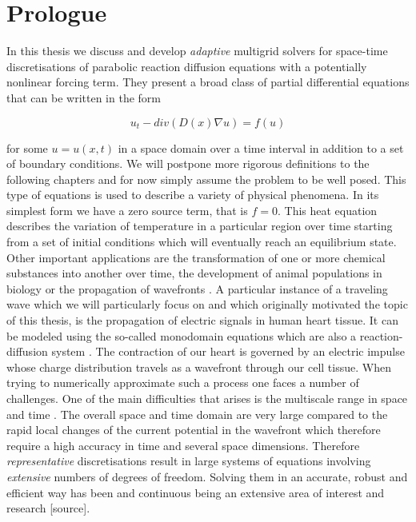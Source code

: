\documentclass[../draft_1.tex]{subfiles}
\begin{document}
\chapter{Prologue}

In this thesis we  discuss and develop \textit{adaptive} multigrid solvers for space-time discretisations of parabolic reaction diffusion equations with a potentially nonlinear forcing term. They present a broad class of partial differential equations that can be written in the form
\begin{ceqn}
\begin{equation}
u_t - div ( D(x) \nabla u) = f(u)
\end{equation}
\end{ceqn}
for some $u = u(x,t)$ in a space domain over a time interval in addition to a set of boundary conditions. We will postpone more rigorous definitions to the following chapters and for now simply assume the problem to be well posed. This type of equations is used to describe a variety of physical phenomena. In its simplest form we have a zero source term, that is $f = 0$. This heat equation describes the variation of temperature in a particular region over time starting from a set of initial conditions which will eventually reach an equilibrium state. Other important applications are the transformation of one or more chemical substances into another over time, the development of animal populations in biology \cite{cosner2008reaction} or the propagation of wavefronts \cite{zegeling2004adaptive}. A particular instance of a traveling wave which we will particularly focus on and which originally motivated the topic of this thesis, is the propagation of electric signals in human heart tissue. It can be modeled using the so-called monodomain equations which are also a reaction-diffusion system \cite{franzone2014mathematical}. The contraction of our heart is governed by an electric impulse whose charge distribution travels as a wavefront through our cell tissue. When trying to numerically approximate such a process one faces a number of challenges. One of the main difficulties that arises is the multiscale range in space and time \cite{colli2004parallel}. The overall space and time domain are very large compared to the rapid local changes of the current potential in the wavefront which therefore require a high accuracy in time and several space dimensions. Therefore \textit{representative} discretisations result in large systems of equations involving \textit{extensive} numbers of degrees of freedom. Solving them in an accurate, robust and efficient way has been and continuous being an extensive area of interest and research [source]. 
\end{document}
